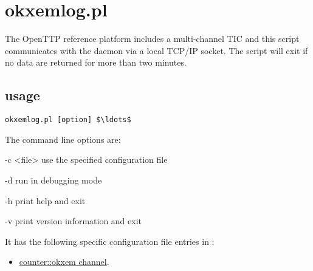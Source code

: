 \section{okxemlog.pl}

\hypertarget{h:okxemlog}{}
The OpenTTP reference platform includes a multi-channel TIC and this script communicates with the daemon
 via a local TCP/IP socket. The script will exit if no data are returned for more than two minutes.

\subsection{usage}

\begin{lstlisting}[mathescape=true]
okxemlog.pl [option] $\ldots$ 
\end{lstlisting}

The command line options are:
\begin{description*}
	\item[-c \textless file\textgreater] use the specified configuration file
	\item[-d]	run in debugging mode
	\item[-h]	print help and exit
	\item[-v]	print version information and exit
\end{description*}

It has the following specific configuration file entries in :
\begin{itemize}
	\item \hyperlink{h:counter_okxem_channel}{counter::okxem channel}.
\end{itemize}
